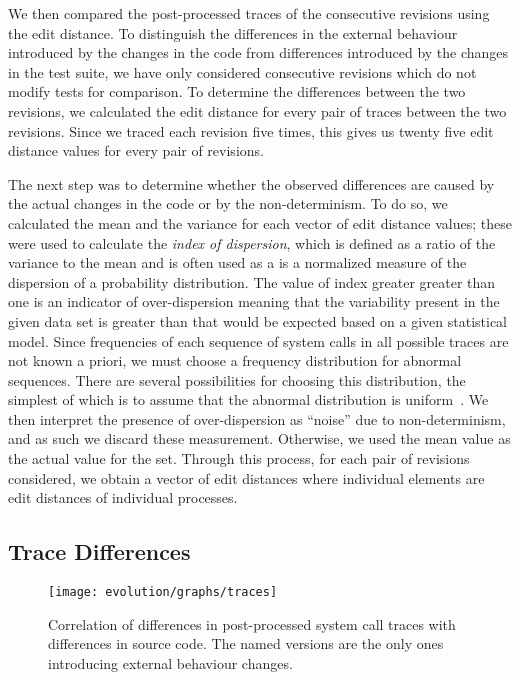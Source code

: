We then compared the post-processed traces of the consecutive revisions using
the edit distance. To distinguish the differences in the external behaviour
introduced by the changes in the code from differences introduced by the
changes in the test suite, we have only considered consecutive revisions which
do not modify tests for comparison. To determine the differences between the
two revisions, we calculated the edit distance for every pair of traces between
the two revisions. Since we traced each revision five times, this gives us
twenty five edit distance values for every pair of revisions.

The next step was to determine whether the observed differences are caused by
the actual changes in the code or by the non-determinism. To do so, we
calculated the mean and the variance for each vector of edit distance values;
these were used to calculate the \emph{index of dispersion}, which is defined
as a ratio of the variance to the mean and is often used as a is a normalized
measure of the dispersion of a probability distribution. The value of index
greater greater than one is an indicator of over-dispersion meaning that the
variability present in the given data set is greater than that would be
expected based on a given statistical model. Since frequencies of each sequence
of system calls in all possible traces are not known a priori, we must choose a
frequency distribution for abnormal sequences. There are several possibilities
for choosing this distribution, the simplest of which is to assume that the
abnormal distribution is uniform~\cite{helman97}. We then interpret the
presence of over-dispersion as ``noise'' due to non-determinism, and as such we
discard these measurement. Otherwise, we used the mean value as the actual
value for the set. Through this process, for each pair of revisions considered,
we obtain a vector of edit distances where individual elements are edit
distances of individual processes.

\subsection{Trace Differences}

\begin{figure}[t]
  \begin{center}
    \texttt{[image: evolution/graphs/traces]}
    \caption{Correlation of differences in post-processed system call
      traces with differences in source code. The named versions
      are the only ones introducing external behaviour changes.}
    \label{fig:correlation}
  \end{center}
\end{figure}

